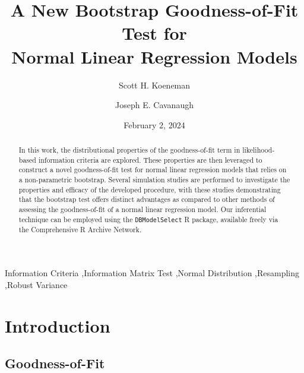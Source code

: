 \documentclass[review]{elsarticle}
\begin{document}
\begin{frontmatter}

	\title{A New Bootstrap Goodness-of-Fit Test for \\ Normal Linear Regression Models}
	
	\author[1]{Scott H. Koeneman}
	\author[2]{Joseph E. Cavanaugh}
	\address[1]{Division of Biostatistics and Bioinformatics, 
	Thomas Jefferson University, 
	130 S. 9th St., 
	Philadelphia, PA, 55038}
 \address[2]{Department of Biostatistics, University of Iowa, 145 N. Riverside Dr., Iowa City, IA, 52242}
	
	\date{February 2, 2024}
	
	\begin{abstract}
	
		In this work, the distributional properties of the goodness-of-fit term in likelihood-based information criteria are explored. These properties are then leveraged
		to construct a novel goodness-of-fit test for normal linear regression models that relies on a non-parametric bootstrap. Several simulation studies are performed to
		investigate the properties and efficacy of the developed procedure, with these studies demonstrating that the bootstrap test offers distinct advantages as compared
		to other methods of assessing the goodness-of-fit of a normal linear regression model. Our inferential technique can be employed using the \texttt{DBModelSelect} R package,
		available freely via the Comprehensive R Archive Network.\\
	
	\end{abstract}
	
	\begin{keyword}
		Information Criteria \sep Information Matrix Test \sep Normal Distribution \sep Resampling \sep Robust Variance \\
	\end{keyword}
	
	\end{frontmatter}
	
	\newpage


\section{Introduction}
	\subsection{Goodness-of-Fit}
\end{document}
